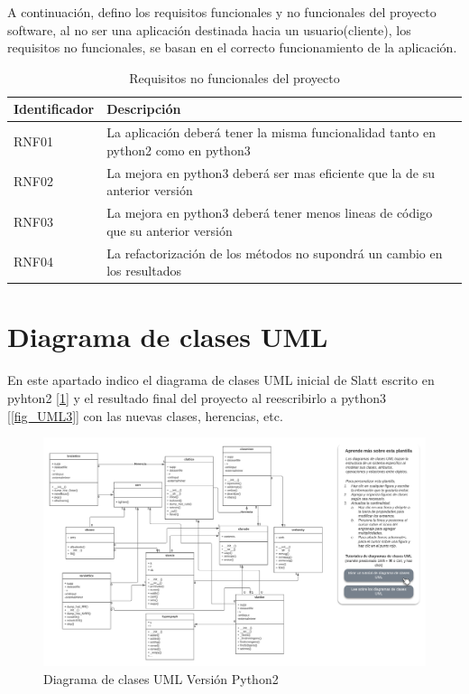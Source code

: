\documentclass{cosas/tfg_domingo}
\begin{document}
A continuación, defino los requisitos funcionales y no funcionales del proyecto software, al no ser una aplicación destinada hacia un usuario(cliente), los requisitos no funcionales, se basan en el correcto funcionamiento de la aplicación.

\begin{table}[h]
\centering
\begin{tabular}{|l|l|}
\hline
Identificador & Descripción                              \\ \hline
RNF01         & La aplicación deberá tener la misma funcionalidad tanto en python2 como en python3                                          \\ \hline
RNF02          & La mejora en python3 deberá ser mas eficiente que la de su anterior versión                                                  \\ \hline
RNF03          & La mejora en python3 deberá tener menos lineas de código que su anterior versión                                         \\ \hline
RNF04          & La refactorización de los métodos no supondrá un cambio en los resultados                                               \\ \hline
\end{tabular}
\caption{Requisitos no funcionales del proyecto}
\label{tab:my-table}
\end{table}

\newpage

\section{Diagrama de clases UML}
En este apartado indico el diagrama de clases UML inicial de Slatt escrito en pyhton2 [\ref{fig_UML2}] y el resultado final del proyecto al reescribirlo a python3 [\ref{fig_UML3}] con las nuevas clases, herencias, etc.

\begin{figure}[ht!] %
\begin{center}
\includegraphics[width=1.45\linewidth]{imagenes/Diagrama en blanco - Clase UML (1).png}
\end{center}
\caption{Diagrama de clases UML Versión Python2}
\label{fig_UML2}
\end{figure}
\end{document}

